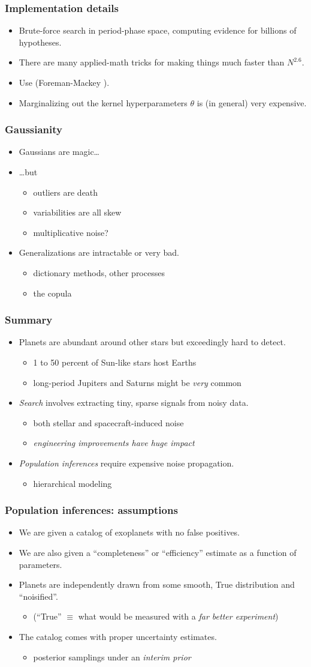 \documentclass[pdftex]{beamer}
\newcommand{\conclusions}{%
\begin{frame}
  \frametitle{Summary}
  \begin{itemize}
  \item Planets are abundant around other stars but exceedingly hard to detect.
    \begin{itemize}
    \item 1 to 50 percent of Sun-like stars host Earths
    \item long-period Jupiters and Saturns might be \emph{very} common
    \end{itemize}
  \item \emph{Search} involves extracting tiny, sparse signals from noisy data.
    \begin{itemize}
    \item both stellar and spacecraft-induced noise
    \item \emph{engineering improvements have huge impact}
    \end{itemize}
  \item \emph{Population inferences} require expensive noise propagation.
    \begin{itemize}
    \item hierarchical modeling
    \end{itemize}
  \end{itemize}
\end{frame}}
\begin{document}
\begin{frame}
  \frametitle{Implementation details}
  \begin{itemize}
  \item Brute-force search in period-phase space, computing evidence for billions of hypotheses.
  \item There are many applied-math tricks for making things much
    faster than $N^{2.6}$.
  \item Use  {\footnotesize (Foreman-Mackey \etal)}.
  \item Marginalizing out the kernel hyperparameters $\theta$ is (in
    general) very expensive.
  \end{itemize}
\end{frame}

\begin{frame}
  \frametitle{Gaussianity}
  \begin{itemize}
  \item Gaussians are magic\ldots
  \item \ldots but
    \begin{itemize}
    \item outliers are death
    \item variabilities are all skew
    \item multiplicative noise?
    \end{itemize}
  \item Generalizations are intractable or very bad.
    \begin{itemize}
    \item dictionary methods, other processes
    \item the copula
    \end{itemize}
  \end{itemize}
\end{frame}

\conclusions

\begin{frame}
  \frametitle{Population inferences: assumptions}
  \begin{itemize}
  \item We are given a catalog of exoplanets with no false positives.
  \item We are also given a ``completeness'' or ``efficiency'' estimate as a function of parameters.
  \item Planets are independently drawn from some smooth, True distribution and ``noisified''.
    \begin{itemize}
    \item (``True'' $\equiv$ what would be measured with a \emph{far better experiment})
    \end{itemize}
  \item The catalog comes with proper uncertainty estimates.
    \begin{itemize}
    \item posterior samplings under an \emph{interim prior}
    \end{itemize}
  \end{itemize}
\end{frame}
\end{document}
